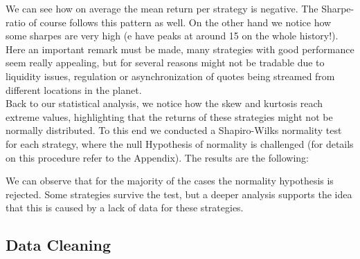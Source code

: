 \documentclass[12pt]{article} %
\numberwithin{equation}{subsection}
\begin{document}
We can see how on average the mean return per strategy is negative. The Sharpe-ratio of course follows this pattern as well. On the other hand we notice how some sharpes are very high (e have peaks at around 15 on the whole history!). Here an important remark must be made, many strategies with good performance seem really appealing, but for several reasons might not be tradable due to liquidity issues, regulation or asynchronization of quotes being streamed from different locations in the planet.\\
Back to our statistical analysis, we notice how the skew and kurtosis reach extreme values, highlighting that the returns of these strategies might not be normally distributed. To this end we conducted a Shapiro-Wilks normality test for each strategy, where the null Hypothesis of normality is challenged (for details on this procedure refer to the Appendix). The results are the following:

We can observe that for the majority of the cases the normality hypothesis is rejected. Some strategies survive the test, but a deeper analysis supports the idea that this is caused by a lack of data for these strategies. 


\subsection{Data Cleaning}
\end{document}
